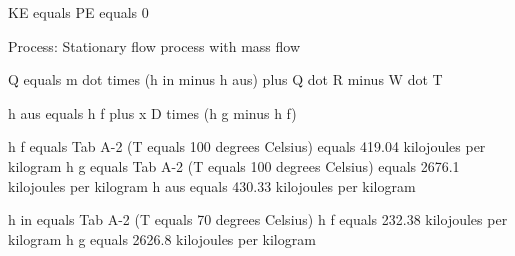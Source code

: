 KE equals PE equals 0  

Process: Stationary flow process with mass flow  

Q equals m dot times (h in minus h aus) plus Q dot R minus W dot T  

h aus equals h f plus x D times (h g minus h f)  

h f equals Tab A-2 (T equals 100 degrees Celsius) equals 419.04 kilojoules per kilogram  
h g equals Tab A-2 (T equals 100 degrees Celsius) equals 2676.1 kilojoules per kilogram  
h aus equals 430.33 kilojoules per kilogram  

h in equals Tab A-2 (T equals 70 degrees Celsius)  
h f equals 232.38 kilojoules per kilogram  
h g equals 2626.8 kilojoules per kilogram